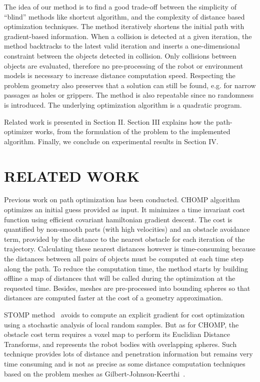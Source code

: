 \documentclass{tADR2e}
\begin{document}
The idea of our method is to find a good trade-off between
the simplicity of “blind” methods like shortcut algorithm,
and the complexity of distance based optimization techniques.
The method iteratively shortens the initial path with gradient-based information.
When a collision is detected at a given iteration, the method backtracks to the
latest valid iteration and inserts a one-dimensional constraint
between the objects detected in collision. Only collisions between objects are 
evaluated, therefore no pre-processing of the
robot or environment models is necessary to increase distance computation speed. 
Respecting the problem geometry also 
preserves that a solution can still be found, e.g. for narrow passages as holes or 
grippers. The method is also repeatable since no randomness is introduced. The underlying optimization algorithm is a quadratic program.

Related work is presented in Section II. Section III explains how the 
path-optimizer works, from the formulation of the problem to the implemented
algorithm. Finally, we conclude on experimental results in Section IV.

\section{RELATED WORK}
Previous work on path optimization has been conducted. CHOMP algorithm~\cite{chompIjrr} optimizes an initial guess provided as
input. It minimizes a time invariant cost function using efficient covariant
hamiltonian gradient descent. The cost is quantified by non-smooth parts (with
high velocities) and an obstacle avoidance term, provided by the distance to the 
nearest obstacle for each iteration of the trajectory. Calculating these nearest 
distances however is time-consuming because the distances between all pairs of 
objects must be computed at each time step along the path. To reduce the 
computation time, the method starts by building offline a map of distances that 
will be called during the optimization at the requested time. Besides, meshes 
are pre-processed into bounding spheres so that distances are computed faster 
at the cost of a geometry approximation.

STOMP method~\cite{KalakrishnanStomp} avoids to compute an 
explicit gradient for cost optimization using a stochastic analysis of local 
random samples. But as for CHOMP, the obstacle cost term requires a voxel map to 
perform its Euclidian Distance Transforms, and represents the robot bodies with 
overlapping spheres. Such technique provides lots of distance and penetration 
information but remains very time consuming and is not as precise as some 
distance computation techniques based on the problem meshes as 
Gilbert-Johnson-Keerthi~\cite{gilbertGjk}.
\end{document}
